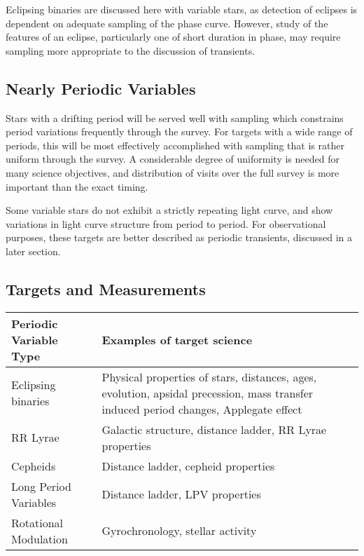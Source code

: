 Eclipsing binaries are discussed here with variable stars, as detection of eclipses is dependent on adequate sampling of the phase curve.  However, study of the  features of an eclipse, particularly one of short duration in phase, may require sampling more appropriate to the discussion of transients.

\subsection{Nearly Periodic Variables}

Stars with a drifting  period will be served well with sampling which constrains period variations frequently through the survey.  For targets with a wide range of periods, this will be most effectively accomplished with sampling that is rather uniform through the survey.  A considerable degree of uniformity is needed for many science objectives, and distribution of visits over the full survey is more important than the exact timing.

Some variable stars do not exhibit a strictly repeating light curve, and show variations in light curve structure from period to period.  For observational purposes, these targets are better described as periodic transients, discussed in a later section.



\subsection{Targets and Measurements}
\label{sec:keyword:targets}

\begin{center}
\begin{tabular}{| l | p{10cm} |}
\hline Periodic Variable Type & Examples of target science\\
\hline
Eclipsing binaries & Physical properties of stars, distances, ages, evolution, apsidal precession, mass transfer induced period changes, Applegate effect\\
RR Lyrae & Galactic structure, distance ladder, RR Lyrae properties\\
Cepheids & Distance ladder, cepheid properties\\
Long Period Variables & Distance ladder, LPV properties\\
Rotational Modulation & Gyrochronology, stellar activity\\
 \hline \end{tabular}
 \end{center}

